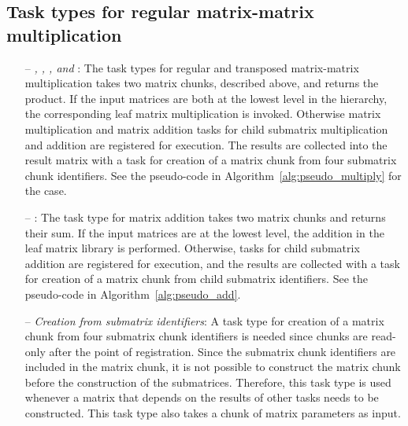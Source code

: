 \documentclass{elsarticle}
\begin{document}
\subsection{Task types for regular matrix-matrix multiplication}

\begin{itemize}
\item[--]\emph{, , , and }:
  The task types for regular and transposed matrix-matrix
  multiplication takes two matrix chunks, described above, and returns
  the product.  If the input matrices are both at the lowest level in
  the hierarchy, the corresponding leaf matrix multiplication is
  invoked.
  Otherwise matrix multiplication and matrix addition tasks for child
  submatrix multiplication and addition are registered for
  execution. The results are collected into the result matrix with a
  task for creation of a matrix chunk from four submatrix chunk
  identifiers. See the pseudo-code in
  Algorithm~\ref{alg:pseudo_multiply} for the  case.
\item[--]\emph{}:
  The task type for matrix addition takes two matrix chunks and
  returns their sum. If the input matrices are at the lowest level,
  the addition in the leaf matrix library is performed.
  Otherwise, tasks for child submatrix addition are registered for
  execution, and the results are collected with a task for creation of
  a matrix chunk from child submatrix identifiers. See the pseudo-code
  in Algorithm~\ref{alg:pseudo_add}.
\item[--]\emph{Creation from submatrix identifiers}:
  A task type for creation of a matrix chunk from four submatrix chunk
  identifiers is needed since chunks are read-only after the point of
  registration. Since the submatrix chunk identifiers are included in
  the matrix chunk, it is not possible to construct the matrix chunk
  before the construction of the submatrices. Therefore, this task
  type is used whenever a matrix that depends on the results of other
  tasks needs to be constructed.
  This task type also takes a chunk of matrix parameters as input.
\end{itemize}
\end{document}
